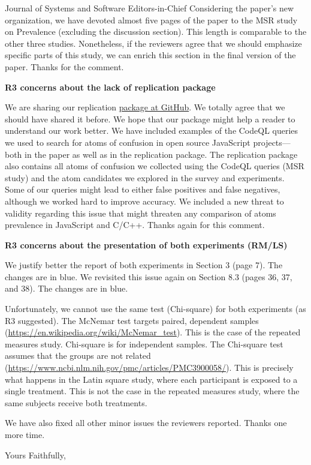 \documentclass{letter}
\begin{document}
\begin{letter}{Journal of Systems and Software Editors-in-Chief}
Considering the paper's new organization, we have devoted almost five pages of the paper to the MSR study on
Prevalence (excluding the discussion section). This length is comparable to the other three studies.
Nonetheless, if the reviewers agree that we should emphasize specific parts of this study,
we can enrich this section in the final version of the paper. Thanks for the comment.

{\bf R3 concerns about the lack of replication package}

We are sharing our replication \href{https://github.com/rbonifacio/AtomsJS/tree/main/package}{package at GitHub}.
We totally agree that we should have shared it before. We hope that our package might
help a reader to understand our work better. We have included examples of the CodeQL queries we used
to search for atoms of confusion in open source JavaScript projects---both in the paper
as well as in the replication package. The replication package also contains all atoms of
confusion we collected using the CodeQL queries (MSR study) and the atom candidates
we explored in the survey and experiments. Some of our queries might lead to
either false positives and false negatives, although we worked hard to improve
accuracy. We included a new threat to validity regarding this issue that might threaten
any comparison of atoms prevalence in JavaScript and C/C++. Thanks again for this comment.

{\bf R3 concerns about the presentation of both experiments (RM/LS)}

We justify better the report of both experiments in Section 3 (page 7). The changes
are in {\color{blue}blue}. We revisited this issue again on Section 8.3 (pages 36, 37, and
38). The changes are in {\color{blue}blue}.

Unfortunately, we cannot use the same test (Chi-square) for both experiments (as R3 suggested). The McNemar test targets paired,
dependent samples (\url{https://en.wikipedia.org/wiki/McNemar_test}). This is the case of the repeated measures study.
Chi-square is for independent samples. The Chi-square test assumes that the groups are not related
(\url{https://www.ncbi.nlm.nih.gov/pmc/articles/PMC3900058/}). This is precisely what happens in the Latin square study,
where each participant is exposed to a single treatment. This is not the case in the repeated measures study,
where the same subjects receive both treatments. 


We have also fixed all other minor issues the reviewers reported. Thanks one more time.

\closing{Yours Faithfully,}


\end{letter}
\end{document}
